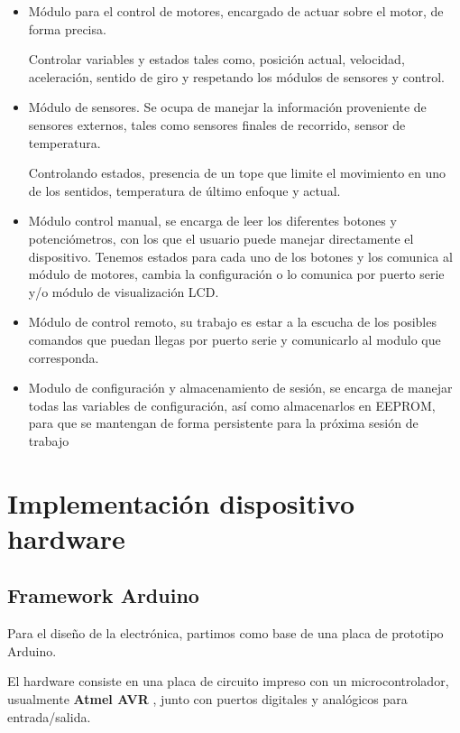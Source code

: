 \begin{itemize}

\item Módulo para el control de motores, encargado de actuar sobre el motor, de forma precisa.

Controlar variables y estados tales como, posición actual, velocidad, aceleración, sentido de giro y respetando los módulos de sensores y control. 

\item Módulo de sensores. Se ocupa de manejar la información proveniente de sensores externos, tales como sensores finales de recorrido, sensor de temperatura.

Controlando estados, presencia de un tope que limite el movimiento en uno de los sentidos, temperatura de último enfoque y actual.

\item Módulo control manual, se encarga de leer los diferentes botones y potenciómetros, con los que el usuario puede manejar directamente el dispositivo.
Tenemos estados para cada uno de los botones y los comunica al módulo de motores, cambia la configuración o lo comunica por puerto serie y/o módulo de visualización LCD.

\item Módulo de control remoto, su trabajo es estar a la escucha de los posibles comandos que puedan llegas por puerto serie y comunicarlo al modulo que corresponda. 

\item Modulo de configuración y almacenamiento de sesión, se encarga de manejar todas las variables de configuración, así como almacenarlos en EEPROM, para que se mantengan de forma persistente para la próxima sesión de trabajo

\end{itemize}


\section{Implementación dispositivo hardware}

\subsection{Framework Arduino}
Para el diseño de la electrónica, partimos como base de una placa de prototipo Arduino.

\bigskip
El hardware consiste en una placa de circuito impreso con un microcontrolador, usualmente \textbf{Atmel AVR} \cite{Atmel}, junto con  puertos digitales y analógicos para entrada/salida.

